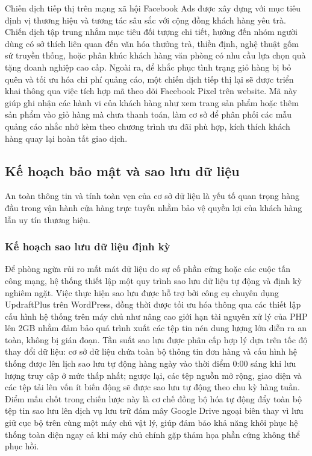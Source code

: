 Chiến dịch tiếp thị trên mạng xã hội Facebook Ads được xây dựng với mục tiêu định vị thương hiệu và tương tác sâu sắc với cộng đồng khách hàng yêu trà. Chiến dịch tập trung nhắm mục tiêu đối tượng chi tiết, hướng đến nhóm người dùng có sở thích liên quan đến văn hóa thưởng trà, thiền định, nghệ thuật gốm sứ truyền thống, hoặc phân khúc khách hàng văn phòng có nhu cầu lựa chọn quà tặng doanh nghiệp cao cấp. Ngoài ra, để khắc phục tình trạng giỏ hàng bị bỏ quên và tối ưu hóa chi phí quảng cáo, một chiến dịch tiếp thị lại sẽ được triển khai thông qua việc tích hợp mã theo dõi Facebook Pixel trên website. Mã này giúp ghi nhận các hành vi của khách hàng như xem trang sản phẩm hoặc thêm sản phẩm vào giỏ hàng mà chưa thanh toán, làm cơ sở để phân phối các mẫu quảng cáo nhắc nhở kèm theo chương trình ưu đãi phù hợp, kích thích khách hàng quay lại hoàn tất giao dịch.

\subsection{Kế hoạch bảo mật và sao lưu dữ liệu}

An toàn thông tin và tính toàn vẹn của cơ sở dữ liệu là yếu tố quan trọng hàng đầu trong vận hành cửa hàng trực tuyến nhằm bảo vệ quyền lợi của khách hàng lẫn uy tín thương hiệu.

\subsubsection{Kế hoạch sao lưu dữ liệu định kỳ}

Để phòng ngừa rủi ro mất mát dữ liệu do sự cố phần cứng hoặc các cuộc tấn công mạng, hệ thống thiết lập một quy trình sao lưu dữ liệu tự động và định kỳ nghiêm ngặt. Việc thực hiện sao lưu được hỗ trợ bởi công cụ chuyên dụng UpdraftPlus \cite{plugin_updraftplus} trên WordPress, đồng thời được tối ưu hóa thông qua các thiết lập cấu hình hệ thống trên máy chủ như nâng cao giới hạn tài nguyên xử lý của PHP lên 2GB nhằm đảm bảo quá trình xuất các tệp tin nén dung lượng lớn diễn ra an toàn, không bị gián đoạn. Tần suất sao lưu được phân cấp hợp lý dựa trên tốc độ thay đổi dữ liệu: cơ sở dữ liệu chứa toàn bộ thông tin đơn hàng và cấu hình hệ thống được lên lịch sao lưu tự động hàng ngày vào thời điểm 0:00 sáng khi lưu lượng truy cập ở mức thấp nhất; ngược lại, các tệp nguồn mở rộng, giao diện và các tệp tải lên vốn ít biến động sẽ được sao lưu tự động theo chu kỳ hàng tuần. Điểm mấu chốt trong chiến lược này là cơ chế đồng bộ hóa tự động đẩy toàn bộ tệp tin sao lưu lên dịch vụ lưu trữ đám mây Google Drive ngoại biên thay vì lưu giữ cục bộ trên cùng một máy chủ vật lý, giúp đảm bảo khả năng khôi phục hệ thống toàn diện ngay cả khi máy chủ chính gặp thảm họa phần cứng không thể phục hồi.

